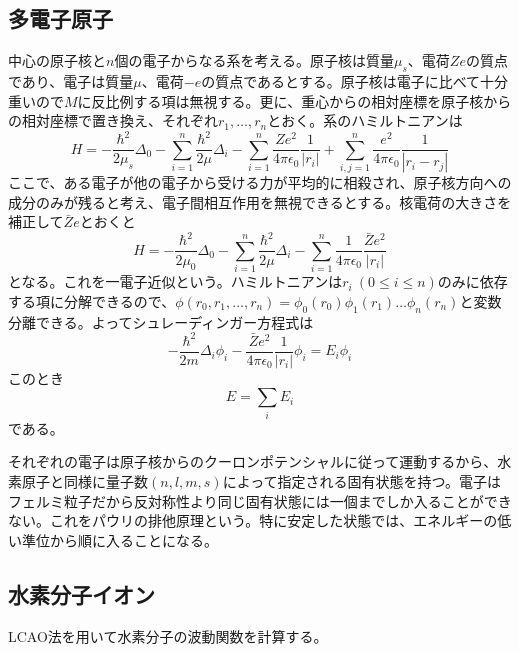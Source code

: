 \subsection{多電子原子}
    中心の原子核と$n$個の電子からなる系を考える。原子核は質量$\mu_s$、電荷$Ze$の質点であり、電子は質量$\mu$、電荷$-e$の質点であるとする。原子核は電子に比べて十分重いので$M$に反比例する項は無視する。更に、重心からの相対座標を原子核からの相対座標で置き換え、それぞれ$r_1, \dots, r_n$とおく。系のハミルトニアンは
        \[H = -\frac{\hbar^2}{2\mu_s}\Delta_0 - \sum_{i=1}^n \frac{\hbar^2}{2\mu}\Delta_i - \sum_{i=1}^n \frac{Ze^2}{4\pi\epsilon_0}\frac{1}{|r_i|} + \sum_{i,j=1}^n \frac{e^2}{4\pi\epsilon_0}\frac{1}{|r_i - r_j|}\]
    ここで、ある電子が他の電子から受ける力が平均的に相殺され、原子核方向への成分のみが残ると考え、電子間相互作用を無視できるとする。核電荷の大きさを補正して$\bar{Z}e$とおくと
        \[H = -\frac{\hbar^2}{2\mu_0}\Delta_0 - \sum_{i=1}^n \frac{\hbar^2}{2\mu}\Delta_i - \sum_{i=1}^n \frac{1}{4\pi\epsilon_0}\frac{\bar{Z}e^2}{|r_i|}\]
    となる。これを一電子近似という。ハミルトニアンは$r_i\ (0 \leq i \leq n)$のみに依存する項に分解できるので、$\phi(r_0, r_1, \dots, r_n) = \phi_0(r_0)\phi_1(r_1) \dots \phi_n(r_n)$と変数分離できる。よってシュレーディンガー方程式は
        \[-\frac{\hbar^2}{2m}\Delta_i\phi_i - \frac{\bar{Z}e^2}{4\pi\epsilon_0}\frac{1}{|r_i|}\phi_i = E_i\phi_i\]
    このとき
        \[E = \sum_i E_i\]
    である。

    それぞれの電子は原子核からのクーロンポテンシャルに従って運動するから、水素原子と同様に量子数$(n, l, m, s)$によって指定される固有状態を持つ。電子はフェルミ粒子だから反対称性より同じ固有状態には一個までしか入ることができない。これをパウリの排他原理という。特に安定した状態では、エネルギーの低い準位から順に入ることになる。

\subsection{水素分子イオン}
    LCAO法を用いて水素分子の波動関数を計算する。

